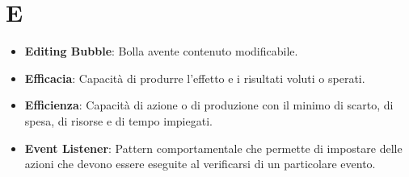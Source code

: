 \section*{E}
\begin{itemize}
	\item
	\textbf{Editing Bubble}: Bolla avente contenuto modificabile.
	\item
	\textbf{Efficacia}: Capacità di produrre l'effetto e i risultati voluti o sperati.
	\item
	\textbf{Efficienza}: Capacità di azione o di produzione con il minimo di scarto, di spesa, di risorse e di tempo impiegati.
	\item
	\textbf{Event Listener}: Pattern comportamentale che permette di impostare delle azioni che devono essere eseguite al verificarsi di un particolare evento.
\end{itemize}
\newpage
